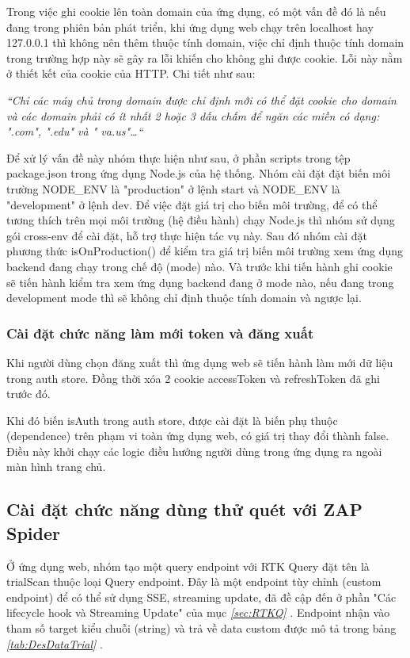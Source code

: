 Trong việc ghi cookie lên toàn domain của ứng dụng, có một vấn đề đó là nếu đang trong phiên bản phát triển, khi ứng dụng web chạy trên localhost hay 127.0.0.1 thì không nên thêm thuộc tính domain, việc chỉ định thuộc tính domain trong trường hợp này sẽ gây ra lỗi khiến cho không ghi được cookie. Lỗi này nằm ở thiết kết của cookie của HTTP. Chi tiết như sau:

\textit{“Chỉ các máy chủ trong domain được chỉ định mới có thể đặt cookie cho domain và các domain phải có ít nhất 2 hoặc 3 dấu chấm để ngăn các miền có dạng: ".com", ".edu" và " va.us"…“} \cite{chap4bib4}

Để xử lý vấn đề này nhóm thực hiện như sau, ở phần scripts trong tệp package.json trong ứng dụng Node.js của hệ thống.
Nhóm cài đặt đặt biến môi trường NODE\_ENV là "production" ở lệnh start và NODE\_ENV là "development" ở lệnh dev.
Để việc đặt giá trị cho biến môi trường, để có thể tương thích trên mọi môi trường (hệ điều hành) chạy Node.js thì nhóm sử dụng gói cross-env để cài đặt, hỗ trợ thực hiện tác vụ này. Sau đó nhóm cài đặt phương thức isOnProduction() để kiểm tra giá trị biến môi trường xem ứng dụng backend đang chạy trong chế độ (mode) nào. Và trước khi tiến hành ghi cookie sẽ tiến hành kiểm tra xem ứng dụng backend đang ở mode nào, nếu đang trong development mode thì sẽ không chỉ định thuộc tính domain và ngược lại.

\subsubsection{Cài đặt chức năng làm mới token và đăng xuất}

\tab 

Khi người dùng chọn đăng xuất thì ứng dụng web sẽ tiến hành làm mới dữ liệu trong auth store.
Đồng thời xóa 2 cookie accessToken và refreshToken đã ghi trước đó.

Khi đó biến isAuth trong auth store, được cài đặt là biến phụ thuộc (dependence) trên phạm vi toàn ứng dụng web, có giá trị thay đổi thành false. Điều này khởi chạy các logic điều hướng người dùng trong ứng dụng ra ngoài màn hình trang chủ.

\subsection{Cài đặt chức năng dùng thử quét với ZAP Spider} \label{subsec:CaiDatDungThuZapSpider}

\tab Ở ứng dụng web, nhóm tạo một query endpoint với RTK Query đặt tên là trialScan thuộc loại Query endpoint.
Đây là một endpoint tùy chỉnh (custom endpoint) để có thể sử dụng SSE, streaming update, đã đề cập đến ở phần "Các lifecycle hook và Streaming Update" của mục \textit{\ref{sec:RTKQ} }.
Endpoint nhận vào tham số target kiểu chuỗi (string) và trả về data custom được mô tả trong bảng \textit{\ref{tab:DesDataTrial} }.

